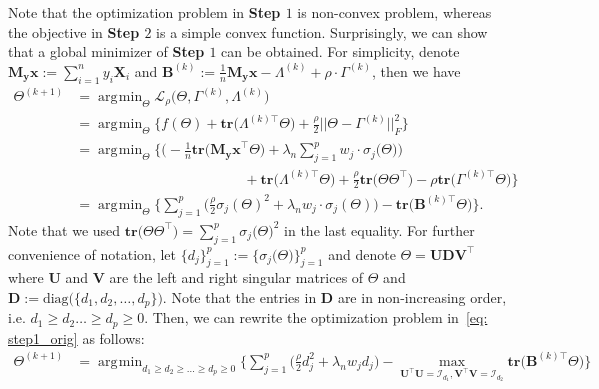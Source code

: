\documentclass[12pt]{article}
\DeclareMathOperator*{\argmin}{\arg\!\min}
\begin{document}
Note that the optimization problem in \textbf{Step $1$} is non-convex problem, whereas the objective in \textbf{Step $2$} is a simple convex function. 
Surprisingly, we can show that a global minimizer of \textbf{Step $1$} can be obtained. 
For simplicity, denote $\mathbf{M_{y}x}:=\sum_{i=1}^{n}y_{i}\mathbf{X}_{i}$ and $\mathbf{B}^{(k)}:=\frac{1}{n}\mathbf{M_{y}x}-\Lambda^{(k)}+\rho \cdot \Gamma^{(k)}$, then we have
\begin{align}
    \Theta^{(k+1)} 
    &= \argmin_{\Theta} \mathcal{L}_{\rho} \big( \Theta,\Gamma^{(k)},\Lambda^{(k)} \big) \nonumber \\
    &= \argmin_{\Theta}  \bigg\{ f(\Theta) + \textbf{tr}\big(\Lambda^{(k) \top}\Theta\big) + \frac{\rho}{2} || \Theta-\Gamma^{(k)} ||_{F}^{2} \bigg\}  \nonumber \\
    &= \argmin_{\Theta} \bigg\{ \bigg(-\frac{1}{n}\textbf{tr}\big(\mathbf{M_{y}x}^{\top}\Theta\big)+\lambda_{n}\sum_{j=1}^{p}w_{j}\cdot \sigma_{j}\big(\Theta\big) \bigg) \nonumber \\
    &\qquad \qquad \qquad \qquad \qquad \qquad + \textbf{tr}\big( \Lambda^{(k) \top}\Theta \big) + \frac{\rho}{2}\textbf{tr}\big(\Theta\Theta^{\top}\big)-\rho\textbf{tr}\big( \Gamma^{(k) \top}\Theta \big) \bigg\} \nonumber \\
    &= \argmin_{\Theta} \bigg\{ \sum_{j=1}^{p} \bigg( \frac{\rho}{2}\sigma_{j}(\Theta)^{2} + \lambda_{n}w_{j}\cdot\sigma_{j}(\Theta) \bigg) -\textbf{tr} \big( \mathbf{B}^{(k) \top}\Theta \big) \bigg\} \label{eq: step1_orig}.
\end{align}
Note that we used $\textbf{tr}\big(\Theta\Theta^{\top}\big)=\sum_{j=1}^{p}\sigma_{j}\big(\Theta\big)^{2}$ in the last equality.
For further convenience of notation, let $\{d_{j}\}_{j=1}^{p}:=\{\sigma_{j}\big(\Theta\big)\}_{j=1}^{p}$ and 
denote $\Theta=\mathbf{UDV^{\top}}$ where 
$\mathbf{U}$ and $\mathbf{V}$ are the left and right singular matrices of $\Theta$ and $\mathbf{D}:=\text{diag}\big(\{d_{1},d_{2},\dots,d_{p}\}\big)$.
Note that the entries in $\mathbf{D}$ are in non-increasing order, i.e. $d_{1} \geq d_{2} \dots \geq d_{p} \geq 0$.
Then, we can rewrite the optimization problem in~\eqref{eq: step1_orig} as follows:
\begin{align}
    \Theta^{(k+1)} 
    &= \argmin_{d_{1}\geq d_{2}\geq \dots \geq d_{p} \geq 0 }\bigg\{ \sum_{j=1}^{p} \bigg( \frac{\rho}{2} d_{j}^{2} + \lambda_{n}w_{j}d_{j} \bigg) - \max_{\mathbf{U}^{\top}\mathbf{U} = \mathcal{I}_{d_{1}}, \mathbf{V}^{\top}\mathbf{V} = \mathcal{I}_{d_{2}}} \textbf{tr}\big(\mathbf{B}^{(k)\top}\Theta\big) \bigg\} \label{eq: step1_sec} 
\end{align}
\end{document}
